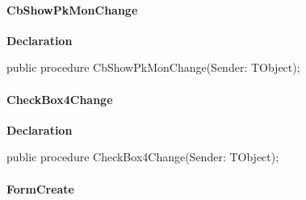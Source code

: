 \documentclass{report}
\newif\ifpdf
\begin{document}
\paragraph*{CbShowPkMonChange}\hspace*{\fill}

\label{settings.TFmConfig-CbShowPkMonChange}
\begin{list}{}{
\setlength{\itemindent}{0cm}
\setlength{\listparindent}{0cm}
\setlength{\leftmargin}{\evensidemargin}
\addtolength{\leftmargin}{\tmplength}
\settowidth{\labelsep}{X}
\addtolength{\leftmargin}{\labelsep}
\setlength{\labelwidth}{\tmplength}
}
\item[\textbf{Declaration}\hfill]
\ifpdf
\begin{flushleft}
\fi
\begin{ttfamily}
public procedure CbShowPkMonChange(Sender: TObject);\end{ttfamily}

\ifpdf
\end{flushleft}
\fi

\end{list}
\paragraph*{CheckBox4Change}\hspace*{\fill}

\label{settings.TFmConfig-CheckBox4Change}
\begin{list}{}{
\setlength{\itemindent}{0cm}
\setlength{\listparindent}{0cm}
\setlength{\leftmargin}{\evensidemargin}
\addtolength{\leftmargin}{\tmplength}
\settowidth{\labelsep}{X}
\addtolength{\leftmargin}{\labelsep}
\setlength{\labelwidth}{\tmplength}
}
\item[\textbf{Declaration}\hfill]
\ifpdf
\begin{flushleft}
\fi
\begin{ttfamily}
public procedure CheckBox4Change(Sender: TObject);\end{ttfamily}

\ifpdf
\end{flushleft}
\fi

\end{list}
\paragraph*{FormCreate}\hspace*{\fill}
\end{document}
